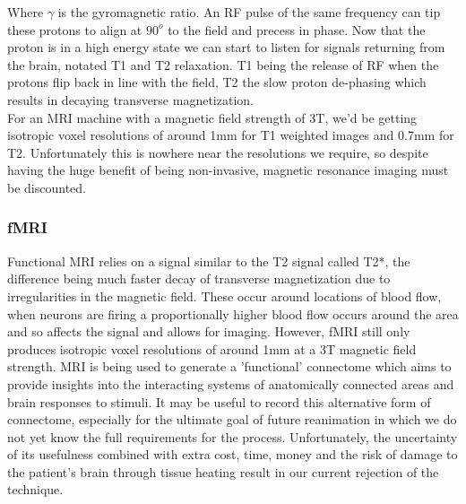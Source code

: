 \documentclass[a4paper, 11pt]{article}
\numberwithin{equation}{section}
\begin{document}
Where $\gamma$ is the gyromagnetic ratio. An RF pulse of the same frequency can tip these protons to align at $90^{o}$ to the field and precess in phase. Now that the proton is in a high energy state we can start to listen for signals returning from the brain, notated T1 and T2 relaxation. T1 being the release of RF when the protons flip back in line with the field, T2 the slow proton de-phasing which results in decaying transverse magnetization. \cite{weishaupt2008does}\\
For an MRI machine with a magnetic field strength of 3T, we'd be getting isotropic voxel resolutions of around 1mm for T1 weighted images and 0.7mm for T2. \cite{fan2016mgh} Unfortunately this is nowhere near the resolutions we require, so despite having the huge benefit of being non-invasive, magnetic resonance imaging must be discounted.\\
\subsubsection{fMRI}
Functional MRI relies on a signal similar to the T2 signal called T2*, the difference being much faster decay of transverse magnetization due to irregularities in the magnetic field. These occur around locations of blood flow, when neurons are firing a proportionally higher blood flow occurs around the area and so affects the signal and allows for imaging. However, fMRI still only produces isotropic voxel resolutions of around 1mm at a 3T magnetic field strength. MRI is being used to generate a 'functional' connectome which aims to provide insights into the interacting systems of anatomically connected areas and brain responses to stimuli\cite{van2010intrinsic}. It may be useful to record this alternative form of connectome, especially for the ultimate goal of future reanimation in which we do not yet know the full requirements for the process. Unfortunately, the uncertainty of its usefulness combined with extra cost, time, money and the risk of damage to the patient's brain through tissue heating result in our current rejection of the technique.\\
\end{document}
